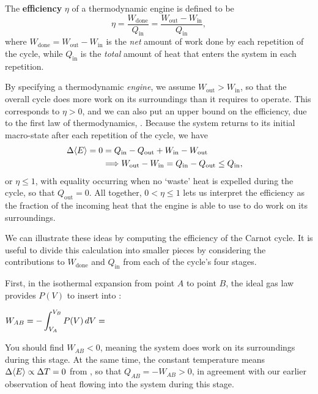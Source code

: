 \begin{shaded}
  The \textbf{efficiency} $\eta$ of a thermodynamic engine is defined to be
  \begin{equation}
    \label{eq:efficiency}
    \eta = \frac{W_{\text{done}}}{Q_{\text{in}}} = \frac{W_{\text{out}} - W_{\text{in}}}{Q_{\text{in}}},
  \end{equation}
  where $W_{\text{done}} = W_{\text{out}} - W_{\text{in}}$ is the \textit{net} amount of work done by each repetition of the cycle, while $Q_{\text{in}}$ is the \textit{total} amount of heat that enters the system in each repetition.
\end{shaded}

By specifying a thermodynamic \textit{engine}, we assume $W_{\text{out}} > W_{\text{in}}$, so that the overall cycle does more work on its surroundings than it requires to operate.
This corresponds to $\eta > 0$, and we can also put an upper bound on the efficiency, due to the first law of thermodynamics, .
Because the system returns to its initial macro-state after each repetition of the cycle, we have
\begin{align}
  \Delta\!\left\langle E \right\rangle = 0 & = Q_{\text{in}} - Q_{\text{out}} + W_{\text{in}} - W_{\text{out}} \cr
                   & \Longrightarrow W_{\text{out}} - W_{\text{in}} = Q_{\text{in}} - Q_{\text{out}} \leq Q_{\text{in}}, \label{eq:cycle_heat_work}
\end{align}
or $\eta \leq 1$, with equality occurring when no `waste' heat is expelled during the cycle, so that $Q_{\text{out}} = 0$.
All together, $0 < \eta \leq 1$ lets us interpret the efficiency as the fraction of the incoming heat that the engine is able to use to do work on its surroundings.

We can illustrate these ideas by computing the efficiency of the Carnot cycle.
It is useful to divide this calculation into smaller pieces by considering the contributions to $W_{\text{done}}$ and $Q_{\text{in}}$ from each of the cycle's four stages.

First, in the isothermal expansion from point $A$ to point $B$, the ideal gas law provides $P(V)$ to insert into :
\begin{mdframed}
  $\displaystyle W_{AB} = -\int_{V_A}^{V_B} P(V) \mathop{dV} = $ \\[75 pt]
\end{mdframed}
You should find $W_{AB} < 0$, meaning the system does work on its surroundings during this stage.
At the same time, the constant temperature means $\Delta\!\left\langle E \right\rangle \propto \Delta T = 0$ from , so that $Q_{AB} = -W_{AB} > 0$, in agreement with our earlier observation of heat flowing into the system during this stage.

